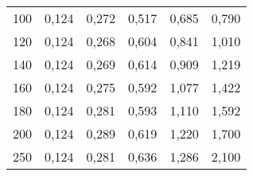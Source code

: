 \begin{figure}
\begin{tabular}{c c c c c c}
     100 & 0,124 &   0,272 &   0,517 &   0,685 &   0,790 \\
     120 & 0,124 &   0,268 &   0,604 &   0,841 &   1,010 \\
     140 & 0,124 &   0,269 &   0,614 &   0,909 &   1,219 \\
     160 & 0,124 &   0,275 &   0,592 &   1,077 &   1,422 \\
     180 & 0,124 &   0,281 &   0,593 &   1,110 &   1,592 \\
     200 & 0,124 &   0,289 &   0,619 &   1,220 &   1,700 \\
     250 & 0,124 &   0,281 &   0,636 &   1,286 &   2,100 \\
  \bottomrule
  \end{tabular}
\end{figure}


